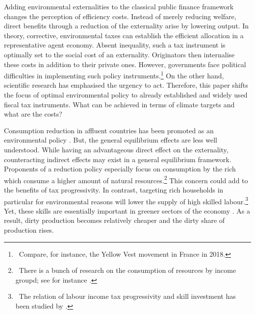 Adding environmental externalities to the classical public finance framework changes the perception of efficiency costs. Instead of merely reducing welfare, direct benefits through a reduction of the externality arise by lowering output. 
In theory, corrective, environmental taxes can establish the efficient allocation in a representative agent economy. Absent inequality, such a tax instrument is optimally set to the social cost of an externality. Originators then internalise these costs in addition to their private ones. However, governments face political difficulties in implementing such policy instruments.\footnote{\ Compare, for instance, the Yellow Vest movement in France in 2018.} On the other hand, scientific research has emphasised the urgency to act. Therefore, this paper shifts the focus of optimal environmental policy to already established and widely used fiscal tax instruments. What can be achieved in terms of climate targets and what are the costs?

 Consumption reduction in affluent countries has been promoted as an environmental policy \citep{Schor2005SustainableReduction, Pullinger2014WorkingDesign, Arrow2004AreMuch}. But, the general equilibrium effects are less well understood.
While having an advantageous direct effect on the externality, counteracting indirect effects may exist in a general equilibrium framework. Proponents of a reduction policy especially focus on consumption by the rich which consume a higher amount of natural resources.\footnote{\ There is a bunch of research on the consumption of resources by income groupd; see for instance \cite{Sager2019IncomeCurves}.} %
This concern could add to the benefits of tax progressivity.
In contrast, targeting rich households in particular for environmental reasons will lower the supply of high skilled labour.\footnote{\ The relation of labour income tax progressivity and skill investment has been studied by \cite{Heathcote2017OptimalFramework}.} Yet, these skills are essentially important in greener sectors of the economy \citep{Consoli2016DoCapital}. As a result, dirty production becomes relatively cheaper and the dirty share of production rises. 

